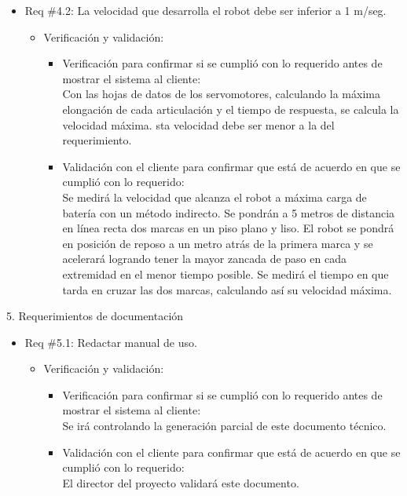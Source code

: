 \documentclass[
11pt, %
codirector, %
]{charter}
\begin{document}
\begin{itemize}
\item Req \#4.2: La velocidad que desarrolla el robot debe ser inferior a 1 m/seg. 
\begin{itemize}
\item Verificación y validación:
	\begin{itemize}
	\item Verificación para confirmar si se cumplió con lo requerido 	antes de mostrar el sistema al cliente:\\
 	Con las hojas de datos de los servomotores, calculando la máxima elongación de cada articulación y el tiempo de respuesta, se calcula la velocidad máxima. sta velocidad debe ser menor a la del requerimiento.
	\item Validación con el cliente para confirmar que está de 				acuerdo en que se cumplió con lo requerido:\\
	Se medirá la velocidad que alcanza el robot a máxima carga de
	batería con un método indirecto. Se pondrán a 5 metros de
	distancia en línea recta dos marcas en un piso plano y liso. El
	robot se pondrá en posición de reposo a un metro atrás de la
	primera marca y se acelerará logrando tener la mayor zancada de paso en cada extremidad en el menor tiempo posible. Se medirá el
	tiempo en que tarda en cruzar las dos marcas, calculando así su
	velocidad máxima.   
	\end{itemize}
\end{itemize}
\end{itemize}

\vspace{3cm}

5. Requerimientos de documentación

\begin{itemize}
\item Req \#5.1: Redactar manual de uso. 
\begin{itemize}
\item Verificación y validación:
	\begin{itemize}
	\item Verificación para confirmar si se cumplió con lo requerido 	antes de mostrar el sistema al cliente:\\
	Se irá controlando la generación parcial de este documento
	técnico.
	\item Validación con el cliente para confirmar que está de 				acuerdo en que se cumplió con lo requerido:\\
	El director del proyecto validará este documento.  
	\end{itemize}
\end{itemize}
\end{itemize}
\end{document}
